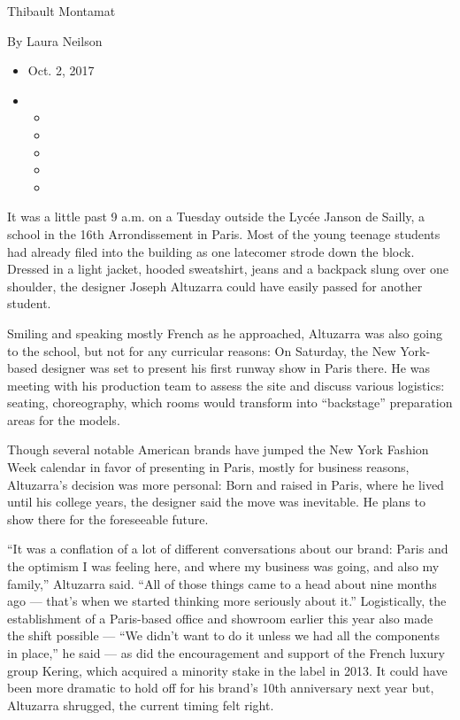 Thibault Montamat

By Laura Neilson

\begin{itemize}
\item
  Oct. 2, 2017
\item
  \begin{itemize}
  \item
  \item
  \item
  \item
  \item
  \end{itemize}
\end{itemize}

It was a little past 9 a.m. on a Tuesday outside the Lycée Janson de
Sailly, a school in the 16th Arrondissement in Paris. Most of the young
teenage students had already filed into the building as one latecomer
strode down the block. Dressed in a light jacket, hooded sweatshirt,
jeans and a backpack slung over one shoulder, the designer Joseph
Altuzarra could have easily passed for another student.

Smiling and speaking mostly French as he approached, Altuzarra was also
going to the school, but not for any curricular reasons: On Saturday,
the New York-based designer was set to present his first runway show in
Paris there. He was meeting with his production team to assess the site
and discuss various logistics: seating, choreography, which rooms would
transform into ``backstage'' preparation areas for the models.

Though several notable American brands have jumped the New York Fashion
Week calendar in favor of presenting in Paris, mostly for business
reasons, Altuzarra's decision was more personal: Born and raised in
Paris, where he lived until his college years, the designer said the
move was inevitable. He plans to show there for the foreseeable future.

``It was a conflation of a lot of different conversations about our
brand: Paris and the optimism I was feeling here, and where my business
was going, and also my family,'' Altuzarra said. ``All of those things
came to a head about nine months ago --- that's when we started thinking
more seriously about it.'' Logistically, the establishment of a
Paris-based office and showroom earlier this year also made the shift
possible --- ``We didn't want to do it unless we had all the components
in place,'' he said --- as did the encouragement and support of the
French luxury group Kering, which acquired a minority stake in the label
in 2013. It could have been more dramatic to hold off for his brand's
10th anniversary next year but, Altuzarra shrugged, the current timing
felt right.

